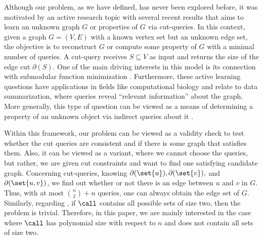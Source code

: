 %
Although our problem, as we have defined, has never been explored before, it was motivated by an active research topic with several recent results \cite{Ap22,Li24} that aims to learn an unknown graph $G$ or properties of $G$ via cut-queries.
%
In this context, given a graph $G = (V, E)$ with a known vertex set but an unknown edge set, the objective is to reconstruct $G$ or compute some property of $G$ with a minimal number of queries. A cut-query receives $S\subseteq V$ as input and returns the size of the edge cut $\partial(S)$.
% 
One of the main driving interests in this model is its connection with submodular function minimization \cite{Aa05}. Furthermore, these active learning questions have applications in fields like computational biology \cite{Vlad98} and relate to data summarization, where queries reveal ``relevant information'' about the graph. More generally, this type of question can be viewed as a means of determining a property of an unknown object via indirect queries about it \cite{Ai88,Du00}.

Within this framework, our problem can be viewed as a validity check to test whether the cut queries are consistent and if there is some graph that satisfies them. Also, it can be viewed as a variant, where we cannot choose the queries, but rather, we are given cut constraints and want to find one satisfying candidate graph. 
% 
Concerning cut-queries, knowing $\partial(\set{u}), \partial(\set{v}),$ and $\partial(\set{u,v})$, we find out whether or not there is an edge between $u$ and $v$ in $G$. Thus, with at most $\binom{n}{2}+n$ queries, one can always obtain the edge set of  $G$. Similarly, regarding \GRC{}, if $\call$ contains all possible sets of size two, then the problem is trivial. Therefore, in this paper, we are mainly interested in the case where $\call$ has polynomial size with respect to $n$ and does not contain all sets of size two.      


